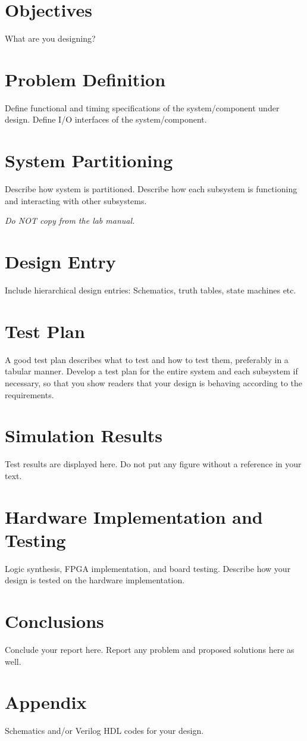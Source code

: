 \documentclass{Ve270lab}
\begin{document}
\section{Objectives}
What are you designing?

\section{Problem Definition}
Define functional and timing specifications of the system/component under design. Define I/O interfaces of the system/component.



\section{System Partitioning}
Describe how system is partitioned. Describe how each subsystem is functioning and interacting with other subsystems.

\emph{Do NOT copy from the lab manual.}

\section{Design Entry}
Include hierarchical design entries: Schematics, truth tables, state machines etc.

\section{Test Plan}
A good test plan describes what to test and how to test them, preferably in a tabular manner. Develop a test plan for the entire system and each subsystem if necessary, so that you show readers that your design is behaving according to the requirements.

\section{Simulation Results}
Test results are displayed here. Do not put any figure without a reference in your text.

\section{Hardware Implementation and Testing}
Logic synthesis, FPGA implementation, and board testing. Describe how your design is tested on the hardware implementation.

\section{Conclusions}
Conclude your report here. Report any problem and proposed solutions here as well.

\section*{Appendix}
Schematics and/or Verilog HDL codes for your design.
\end{document}
